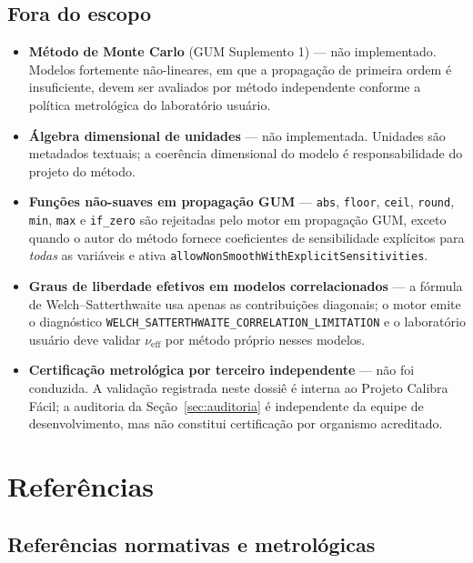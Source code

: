 \documentclass[11pt,a4paper]{article}
\newcommand{\organizationName}{Projeto Calibra Fácil}
\begin{document}
\subsection{Fora do escopo}

\begin{itemize}
  \item \textbf{Método de Monte Carlo} (GUM Suplemento 1) --- não implementado. Modelos fortemente não-lineares, em que a propagação de primeira ordem é insuficiente, devem ser avaliados por método independente conforme a política metrológica do laboratório usuário.
  \item \textbf{Álgebra dimensional de unidades} --- não implementada. Unidades são metadados textuais; a coerência dimensional do modelo é responsabilidade do projeto do método.
  \item \textbf{Funções não-suaves em propagação GUM} --- \texttt{abs}, \texttt{floor}, \texttt{ceil}, \texttt{round}, \texttt{min}, \texttt{max} e \texttt{if\_zero} são rejeitadas pelo motor em propagação GUM, exceto quando o autor do método fornece coeficientes de sensibilidade explícitos para \emph{todas} as variáveis e ativa \texttt{allowNonSmoothWithExplicitSensitivities}.
  \item \textbf{Graus de liberdade efetivos em modelos correlacionados} --- a fórmula de Welch--Satterthwaite usa apenas as contribuições diagonais; o motor emite o diagnóstico \texttt{WELCH\_SATTERTHWAITE\_CORRELATION\_LIMITATION} e o laboratório usuário deve validar \(\nu_{\text{eff}}\) por método próprio nesses modelos.
  \item \textbf{Certificação metrológica por terceiro independente} --- não foi conduzida. A validação registrada neste dossiê é interna ao \organizationName{}; a auditoria da Seção~\ref{sec:auditoria} é independente da equipe de desenvolvimento, mas não constitui certificação por organismo acreditado.
\end{itemize}

\section{Referências}
\label{sec:referencias}

\subsection{Referências normativas e metrológicas}
\end{document}
